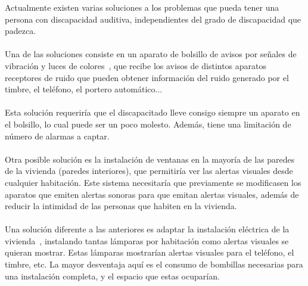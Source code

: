 Actualmente existen varias soluciones a los problemas que pueda tener una persona con discapacidad auditiva, independientes del grado de discapacidad que padezca.\\
\\
Una de las soluciones consiste en un aparato de bolsillo de avisos por señales de vibración y luces de colores~\cite{visiofarma}, que recibe los avisos de distintos aparatos receptores de ruido que pueden obtener información del ruido generado por el timbre, el teléfono, el portero automático...\\
\\
Esta solución requeriría que el discapacitado lleve consigo siempre un aparato en el bolsillo, lo cual puede ser un poco molesto. Además, tiene una limitación de número de alarmas a captar.\\
\\
Otra posible solución es la instalación de ventanas en la mayoría de las paredes de la vivienda (paredes interiores), que permitiría ver las alertas visuales desde cualquier habitación. Este sistema necesitaría que previamente se modificasen los aparatos que emiten alertas sonoras para que emitan alertas visuales, además de reducir la intimidad de las personas que habiten en la vivienda.\\
\\
Una solución diferente a las anteriores es adaptar la instalación eléctrica de la vivienda~\cite{avisossordos}, instalando tantas lámparas por habitación como alertas visuales se quieran mostrar. Estas lámparas mostrarían alertas visuales para el teléfono, el timbre, etc. La mayor desventaja aquí es el consumo de bombillas necesarias para una instalación completa, y el espacio que estas ocuparían.